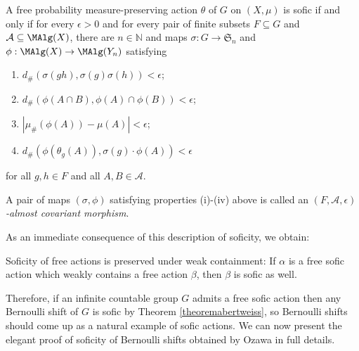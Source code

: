 \begin{corollary}\label{corollaryalmostcovariant}
A free probability measure-preserving action $\theta$ of $G$ on $(X,\mu)$ is sofic if and only if for every $\epsilon>0$ and for every pair of finite subsets $F\subseteq G$ and $\mathcal{A}\subseteq\MAlg(X)$, there are $n\in\mathbb{N}$ and maps $\sigma:G\to\mathfrak{S}_n$ and $\phi:\MAlg(X)\to\MAlg(Y_n)$ satisfying
\begin{enumerate}
\item[(i)] $d_{\#}(\sigma(gh),\sigma(g)\sigma(h))<\epsilon$;
\item[(ii)] $d_{\#}(\phi(A\cap B),\phi(A)\cap\phi(B))<\epsilon$;
\item[(iii)] $|\mu_\#(\phi(A))-\mu(A)|<\epsilon$;
\item[(iv)] $d_{\#}(\phi(\theta_g(A)),\sigma(g)\cdot\phi(A))<\epsilon$
\end{enumerate}
for all $g,h\in F$ and all $A,B\in\mathcal{A}$.
\end{corollary}

\begin{definition}
A pair of maps $(\sigma,\phi)$ satisfying properties (i)-(iv) above is called an \emph{$(F,\mathcal{A},\epsilon)$-almost covariant morphism}.
\end{definition}

As an immediate consequence of this description of soficity, we obtain:

\begin{corollary}
Soficity of free actions is preserved under weak containment: If $\alpha$ is a free sofic action which weakly contains a free action $\beta$, then $\beta$ is sofic as well.
\end{corollary}

Therefore, if an infinite countable group $G$ admits a free sofic action then any Bernoulli shift of $G$ is sofic by Theorem \ref{theoremabertweiss}, so Bernoulli shifts should come up as a natural example of sofic actions. We can now present the elegant proof of soficity of Bernoulli shifts obtained by Ozawa in full details.%

